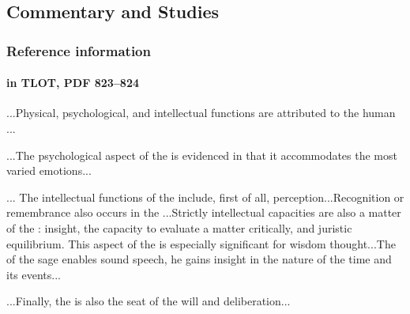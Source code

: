 	
\subsection{Commentary and Studies} %
	\label{HEART-COMMENTARY}

	
		
	\subsubsection{Reference information}
		\label{HEART-reference}
	
		\paragraph{\texorpdfstring{}{} in TLOT, PDF 823--824}
			\label{HEART-TLOT}
			
			...Physical, psychological, and intellectual functions are attributed to the human ...
			
			...The psychological aspect of the  is evidenced in that it accommodates the most varied emotions...
			
			... The intellectual functions of the  include, first of all, perception...Recognition or remembrance also occurs in the ...Strictly intellectual capacities are also a matter of the : insight, the capacity to evaluate a matter critically, and juristic equilibrium. This aspect of the  is especially significant for wisdom thought...The  of the sage enables sound speech, he gains insight in the nature of the time and its events...
			
			...Finally, the  is also the seat of the will and deliberation...
			
